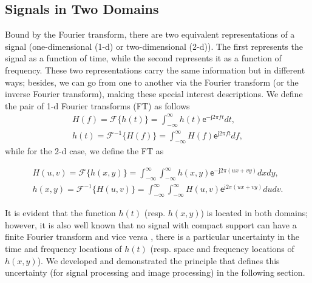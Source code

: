 \subsection{Signals in Two Domains}
Bound by the Fourier transform, there are two equivalent representations of a signal (one-dimensional (1-d) or two-dimensional (2-d)). The first represents the signal as a function of time, while the second represents it as a function of frequency. These two representations carry the same information but in different ways; besides, we can go from one to another via the Fourier transform (or the inverse Fourier transform), making these special interest descriptions. We define the pair of 1-d Fourier transforms (FT) as follows
\begin{equation}\label{eq:fourier_transforms_1d}
    \begin{gathered}
        H(f) = \mathcal{F}\{h(t)\} = \int_{-\infty}^{\infty} h(t) \mathsf{e}^{-\mathsf{j}2\pi f t} dt, \\
        h(t) = \mathcal{F}^{-1}\{H(f)\} = \int_{-\infty}^{\infty} H(f) \mathsf{e}^{\mathsf{j}2\pi f t} df,
    \end{gathered}
\end{equation}
while for the 2-d case, we define the FT as

\begin{equation}\label{eq:fourier_transforms_2d}
    \begin{gathered}
        H(u, v) = \mathcal{F}\{h(x, y)\} = \int_{-\infty}^{\infty} \int_{-\infty}^{\infty} h(x, y) \mathsf{e}^{-\mathsf{j}2\pi (ux + vy)} dx dy, \\
        h(x, y) = \mathcal{F}^{-1}\{H(u, v)\} = \int_{-\infty}^{\infty} \int_{-\infty}^{\infty}  H(u, v) \mathsf{e}^{\mathsf{j}2\pi (ux + vy)} du dv.
    \end{gathered}
\end{equation}


It is evident that the function $h(t)$ (resp. $h(x, y)$) is located in both domains; however, it is also well known that no signal with compact support can have a finite Fourier transform and vice versa \citep{Bracewell:FourierBook:1999}, there is a particular uncertainty in the time and frequency locations of $h(t)$ (resp. space and frequency locations of $h(x, y)$). We developed and demonstrated the principle that defines this uncertainty (for signal processing and image processing) in the following section.%


